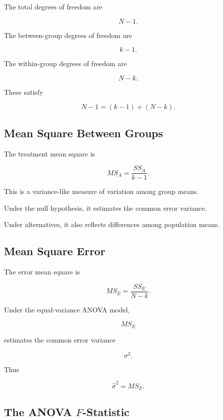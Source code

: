 The total degrees of freedom are

\[
\boxed{
N-1.
}
\]

The between-group degrees of freedom are

\[
\boxed{
k-1.
}
\]

The within-group degrees of freedom are

\[
\boxed{
N-k.
}
\]

These satisfy

\[
\boxed{
N-1
=
(k-1)
+
(N-k).
}
\]

\subsection{Mean Square Between Groups}
\label{subsec:mean-square-between}

The treatment mean square is

\[
\boxed{
MS_A
=
\frac{
SS_A
}{
k-1
}.
}
\]

This is a variance-like measure of variation among group means.

Under the null hypothesis, it estimates the common error variance.

Under alternatives, it also reflects differences among population means.

\subsection{Mean Square Error}
\label{subsec:anova-mean-square-error}

The error mean square is

\[
\boxed{
MS_E
=
\frac{
SS_E
}{
N-k
}.
}
\]

Under the equal-variance ANOVA model,

\[
MS_E
\]

estimates the common error variance

\[
\boxed{
\sigma^2.
}
\]

Thus

\[
\boxed{
\widehat{\sigma}^2
=
MS_E.
}
\]

\subsection{The ANOVA \(F\)-Statistic}
\label{subsec:anova-f-statistic}

